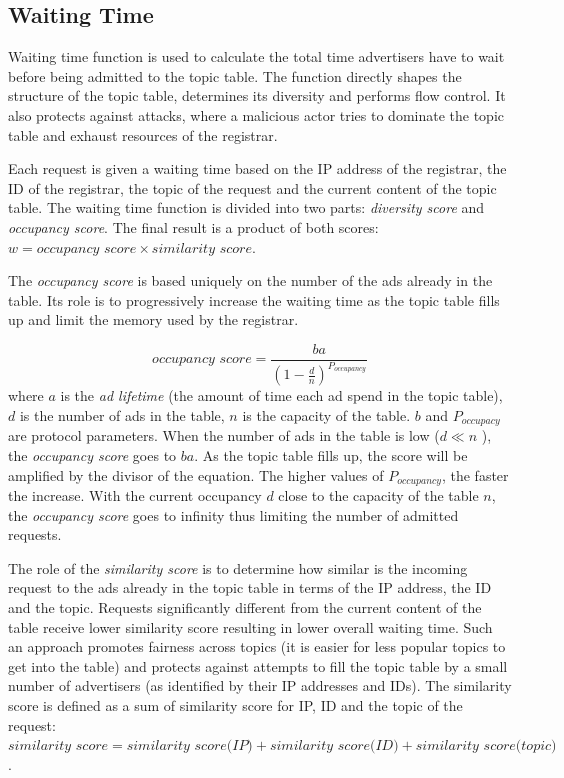 \subsection{Waiting Time}
\label{sec:waitingTime}
Waiting time function is used to calculate the total time advertisers have to wait before being admitted to the topic table. The function directly shapes the structure of the topic table, determines its diversity and performs flow control. It also protects against attacks, where a malicious actor tries to dominate the topic table and exhaust resources of the registrar. 

Each request is given a waiting time based on the IP address of the registrar, the ID of the registrar, the topic of the request and the current content of the topic table. The waiting time function is divided into two parts: \emph{diversity score} and \emph{occupancy score}. The final result is a product of both scores: $w =  \textit{occupancy score} \times \textit{similarity score} $. 

The \emph{occupancy score} is based uniquely on the number of the ads already in the table. Its role is to progressively increase the waiting time as the topic table fills up and limit the memory used by the registrar.

\begin{equation}
    \textit{occupancy score} = \frac{ba}{(1-\frac{d}{n})^{P_{occupancy}}}
\end{equation}
where $a$ is the \emph{ad lifetime} (the amount of time each ad spend in the topic table), $d$ is the number of ads in the table, $n$ is the capacity of the table. $b$ and $P_{occupacy}$ are protocol parameters. When the number of ads in the table is low ($d \ll n$ ), the \emph{occupancy score} goes to $ba$. As the topic table fills up, the score will be amplified by the divisor of the equation. The higher values of $P_{occupancy}$, the faster the increase. With the current occupancy $d$ close to the capacity of the table $n$, the \emph{occupancy score} goes to infinity thus limiting the number of admitted requests. 

The role of the \emph{similarity score} is to determine how similar is the incoming request to the ads already in the topic table in terms of the IP address, the ID and the topic. Requests significantly different from the current content of the table receive lower similarity score resulting in lower overall waiting time. Such an approach promotes fairness across topics (it is easier for less popular topics to get into the table) and protects against attempts to fill the topic table by a small number of advertisers (as identified by their IP addresses and IDs). The similarity score is defined as a sum of similarity score for IP, ID and the topic of the request: $\textit{similarity score} = \textit{similarity score(IP)} + \textit{similarity score(ID)} + \textit{similarity score(topic)}$. 

